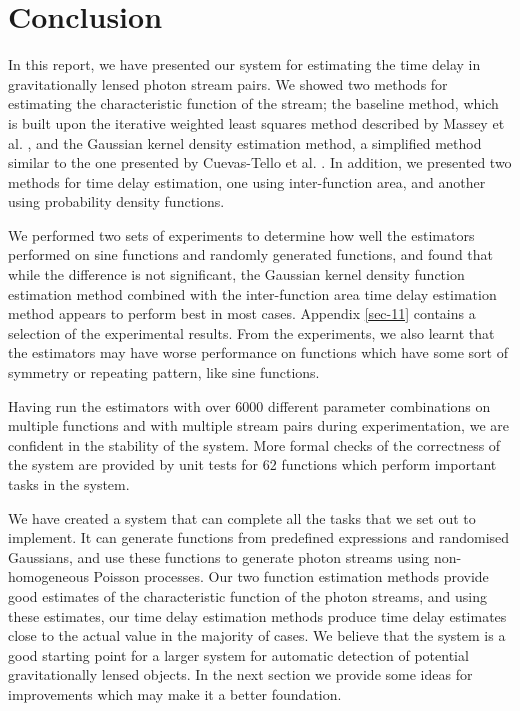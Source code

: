 \documentclass[a4paper,11pt]{article}
\begin{document}
\section{Conclusion}
\label{sec-9}

  In this report, we have presented our system for estimating the time delay in
  gravitationally lensed photon stream pairs. We showed two methods for
  estimating the characteristic function of the stream; the baseline method,
  which is built upon the iterative weighted least squares method described by
  Massey et al. \cite{massey1996estimating}, and the Gaussian kernel density
  estimation method, a simplified method similar to the one presented by
  Cuevas-Tello et al. \cite{cuevas2006accurate}. In addition, we presented two
  methods for time delay estimation, one using inter-function area, and another
  using probability density functions.

  We performed two sets of experiments to determine how well the estimators
  performed on sine functions and randomly generated functions, and found that
  while the difference is not significant, the Gaussian kernel density function
  estimation method combined with the inter-function area time delay estimation
  method appears to perform best in most cases. Appendix \ref{sec-11}
  contains a selection of the experimental results. From the experiments, we
  also learnt that the estimators may have worse performance on functions which
  have some sort of symmetry or repeating pattern, like sine functions.
  
  Having run the estimators with over 6000 different parameter combinations on
  multiple functions and with multiple stream pairs during experimentation, we
  are confident in the stability of the system. More formal checks of the
  correctness of the system are provided by unit tests for 62 functions which
  perform important tasks in the system.

  We have created a system that can complete all the tasks that we set out to
  implement. It can generate functions from predefined expressions and
  randomised Gaussians, and use these functions to generate photon streams using
  non-homogeneous Poisson processes. Our two function estimation methods provide
  good estimates of the characteristic function of the photon streams, and using
  these estimates, our time delay estimation methods produce time delay
  estimates close to the actual value in the majority of cases. We believe that
  the system is a good starting point for a larger system for automatic
  detection of potential gravitationally lensed objects. In the next section we
  provide some ideas for improvements which may make it a better foundation.
\end{document}
